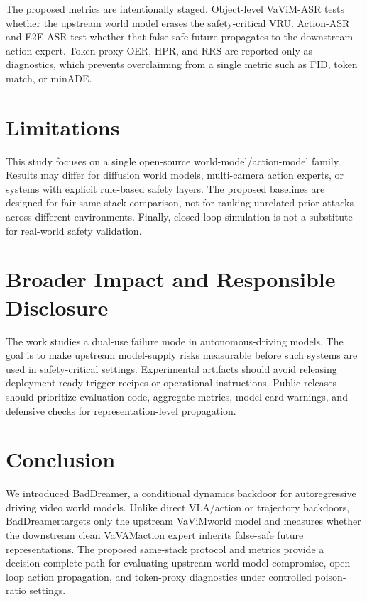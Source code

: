 \documentclass{article}
\newcommand{\method}{BadDreamer}
\newcommand{\vavim}{VaViM}
\newcommand{\vavam}{VaVAM}
\begin{document}
The proposed metrics are intentionally staged. Object-level \vavim-ASR tests
whether the upstream world model erases the safety-critical VRU. Action-ASR and
E2E-ASR test whether that false-safe future propagates to the downstream action
expert. Token-proxy OER, HPR, and RRS are reported only as diagnostics, which
prevents overclaiming from a single metric such as FID, token match, or minADE.

\section{Limitations}

This study focuses on a single open-source world-model/action-model family.
Results may differ for diffusion world models, multi-camera action experts, or
systems with explicit rule-based safety layers. The proposed baselines are
designed for fair same-stack comparison, not for ranking unrelated prior attacks
across different environments. Finally, closed-loop simulation is not a
substitute for real-world safety validation.

\section{Broader Impact and Responsible Disclosure}

The work studies a dual-use failure mode in autonomous-driving models. The goal
is to make upstream model-supply risks measurable before such systems are used
in safety-critical settings. Experimental artifacts should avoid releasing
deployment-ready trigger recipes or operational instructions. Public releases
should prioritize evaluation code, aggregate metrics, model-card warnings, and
defensive checks for representation-level propagation.

\section{Conclusion}

We introduced \method, a conditional dynamics backdoor for autoregressive
driving video world models. Unlike direct VLA/action or trajectory backdoors,
\method targets only the upstream \vavim world model and measures whether the
downstream clean \vavam action expert inherits false-safe future
representations. The proposed same-stack protocol and metrics provide a
decision-complete path for evaluating upstream world-model compromise,
open-loop action propagation, and token-proxy diagnostics under controlled
poison-ratio settings.



\end{document}
